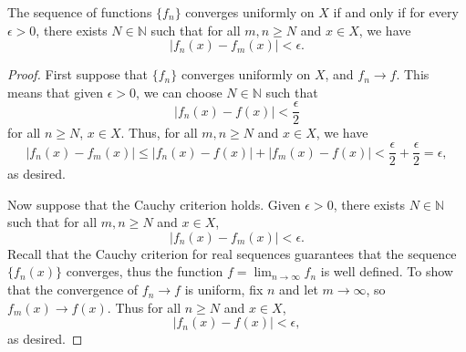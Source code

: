\documentclass[11pt]{article}
\def\N{\mathbb{N}}
\theoremstyle{definition}
\theoremstyle{remark}
\numberwithin{equation}{module}
\begin{document}
    \begin{theorem}
        The sequence of functions $\{f_n\}$ converges uniformly on $X$ if and
        only if for every $\epsilon > 0$, there exists $N \in \N$ such that for all
        $m, n \geq N$ and $x \in X$, we have \[
            |f_n(x) - f_m(x)| < \epsilon.
        \] 
    \end{theorem}
    \begin{proof}
        First suppose that $\{f_n\}$ converges uniformly on $X$, and $f_n \to f$.
        This means that given $\epsilon > 0$, we can choose $N \in \N$ such that \[
            |f_n(x) - f(x)| < \frac{\epsilon}{2}
        \] for all $n \geq N$, $x \in X$.
        Thus, for all $m, n \geq N$ and $x \in X$, we have \[
            |f_n(x) - f_m(x)| \leq |f_n(x) - f(x)| + |f_m(x) - f(x)| <
            \frac{\epsilon}{2} + \frac{\epsilon}{2} = \epsilon,
        \] as desired.

        Now suppose that the Cauchy criterion holds. Given $\epsilon > 0$,
        there exists $N \in \N$ such that for all $m, n \geq N$ and $x \in X$, \[
            |f_n(x) - f_m(x)| < \epsilon.
        \]
        Recall that the Cauchy criterion for real sequences guarantees that the
        sequence $\{f_n(x)\}$ converges, thus the function
        $f = \lim_{n \to \infty} f_n$ is well defined.
        To show that the convergence of $f_n \to f$ is uniform, fix $n$ and let $m
        \to \infty$, so $f_m(x) \to f(x)$. Thus for all $n \geq N$ and $x \in X$, \[
            |f_n(x) - f(x)| < \epsilon,
        \] as desired.
    \end{proof}
\end{document}
